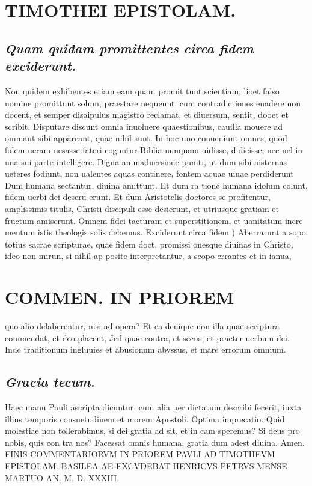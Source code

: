 \documentclass{article}
\begin{document}
\begin{pages}
\section*{TIMOTHEI EPISTOLAM. }
\marginpar{[ p.189 ]}
{}
\subsection*{\textit{Quam quidam promittentes circa fidem exciderunt. }}\pstart Non quidem exhibentes etiam eam quam promit tunt scientiam, lioet falso nomine promittunt solum, praestare nequeunt, cum contradictiones euadere non docent, et semper disaipulus magistro reclamat, et diuersum, sentit, dooet et scribit. Disputare discunt omnia inuoluere quaestionibus, cauilla mouere ad omniaut sibi appareant, quae nihil sunt. In hoc uno conueniunt omnes, quod fidem ueram nesasse fateri coguntur Biblia nunquam uidisse, didicisse, nec uel in una sui parte intelligere. Digna animaduersione puniti, ut dum sibi aisternas ueteres fodiunt, non ualentes aquas continere, fontem aquae uiuae perdiderunt Dum humana sectantur, diuina amittunt. Et dum ra tione humana idolum colunt, fidem uerbi dei deseru erunt. Et dum Aristotelis doctores se profitentur, amplissimis titulis, Christi discipuli esse desierunt, et utriusque gratiam et fructum amiserunt. Omnem fidei tacturam et superstitionem, et uanitatum incre mentum istis theologis solis debemus.  \pend\pstart Exciderunt circa fidem ) Aberrarunt a sopo totius sacrae scripturae, quae fidem doct, promissi onesque diuinas in Christo, ideo non mirun, si nihil ap posite interpretantur, a scopo errantes et in ianua,  \pend
\section*{COMMEN. IN PRIOREM }
\marginpar{[ p.190 ]}\pstart quo alio delaberentur, nisi ad opera? Et ea denique  non illa quae scriptura commendat, et deo placent, Jed quae contra, et secus, et praeter uerbum dei. Inde traditionum ingluuies et abusionum abyssus, et mare errorum omnium.  \pend
{}
{}
\subsection*{\textit{Gracia tecum. }}\pstart Haec manu Pauli ascripta dicuntur, cum alia per dictatum describi fecerit, iuxta illius temporis consuetudinem et morem Apostoli. Optima imprecatio. Quid molestiae non tollerabimus, si dei gratia ad sit, et in cam speremus? Si deus pro nobis, quis con tra nos? Facessat omnis humana, gratia dum adest diuina. Amen.  \pend\pstart FINIS COMMENTARIORVM IN PRIOREM PAVLI AD TIMOTHEVM EPISTOLAM.  \pend\pstart BASILEA AE EXCVDEBAT HENRICVS PETRVS MENSE MARTUO AN. M. D. XXXIII.  \pend
\endnumbering
\end{pages}
\end{document}
